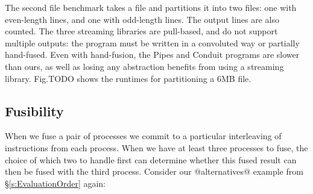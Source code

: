 
The second file benchmark takes a file and partitions it into two files: one with even-length lines, and one with odd-length lines.
The output lines are also counted.
The three streaming libraries are pull-based, and do not support multiple outputs: the program must be written in a convoluted way or partially hand-fused.
Even with hand-fusion, the Pipes and Conduit programs are slower than ours, as well as losing any abstraction benefits from using a streaming library.
Fig.TODO 
shows the runtimes for partitioning a 6MB file.





\subsection{Fusibility}
\label{s:FusionOrder}
When we fuse a pair of processes we commit to a particular interleaving of instructions from each process. When we have at least three processes to fuse, the choice of which two to handle first can determine whether this fused result can then be fused with the third process. Consider our @alternatives@ example from \S\ref{s:EvaluationOrder} again:

